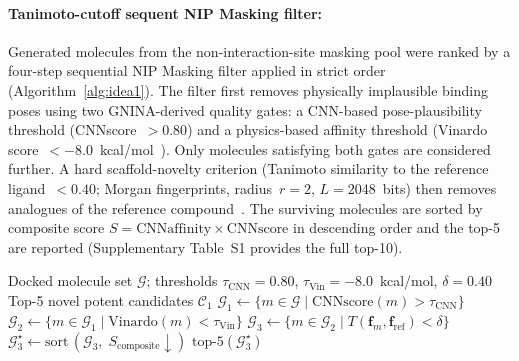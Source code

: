 \documentclass[a4paper,12pt]{article}
\begin{document}
\paragraph{Tanimoto-cutoff sequent NIP Masking filter:}
Generated molecules from the non-interaction-site masking pool
were ranked by a four-step sequential NIP Masking filter applied in strict
order (Algorithm~\ref{alg:idea1}).
The filter first removes physically implausible binding poses
using two GNINA-derived quality gates: a CNN-based pose-plausibility
threshold (CNNscore~$> 0.80$) and a physics-based affinity
threshold (Vinardo score~$< -8.0$~kcal/mol~\cite{quiroga2016vinardo}).
Only molecules satisfying both gates are considered further.
A hard scaffold-novelty criterion (Tanimoto similarity to the
reference ligand~$< 0.40$; Morgan fingerprints, radius~$r = 2$,
$L = 2048$~bits) then removes analogues of the reference
compound~\cite{maggiora2014}.
The surviving molecules are sorted by composite score
$S = \text{CNNaffinity} \times \text{CNNscore}$ in descending
order and the top-5 are reported (Supplementary Table~S1
provides the full top-10).
 
\begin{algorithm}[htbp]
\caption{Tanimoto-Cutoff Sequential Filter}
\label{alg:idea1}
\begin{algorithmic}[1]
\Require Docked molecule set $\mathcal{G}$; thresholds
         $\tau_{\text{CNN}} = 0.80$,
         $\tau_{\text{Vin}} = -8.0$~kcal/mol,
         $\delta = 0.40$
\Ensure  Top-5 novel potent candidates $\mathcal{C}_1$
\State $\mathcal{G}_1 \gets
       \{m \in \mathcal{G} \mid \text{CNNscore}(m) > \tau_{\text{CNN}}\}$
\State $\mathcal{G}_2 \gets
       \{m \in \mathcal{G}_1 \mid \text{Vinardo}(m) < \tau_{\text{Vin}}\}$
\State $\mathcal{G}_3 \gets
       \{m \in \mathcal{G}_2 \mid
       T(\mathbf{f}_m,\mathbf{f}_{\text{ref}}) < \delta\}$
\State $\mathcal{G}_3^{\star} \gets
       \text{sort}\,(\mathcal{G}_3,\;
       S_{\text{composite}}\downarrow)$
\State \Return $\text{top-5}(\mathcal{G}_3^{\star})$
\end{algorithmic}
\end{algorithm}
 
 
 
\end{document}
